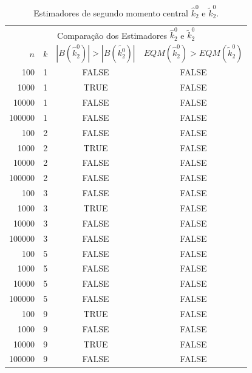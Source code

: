 \documentclass[12pt]{article}
\begin{document}
\begin{table}[h]
  \label{tab:gamma_r_m1}
  \centering
  \begin{tabular}{rccc}
    \toprule
    \multicolumn{4}{c}{Comparação dos Estimadores $\hat{k}_2^0$ e $\tilde{k}_2^0$}\\
    $n$ & $k$ & $|B(\hat{k}_2^0)|>|B(\tilde{k_2^0})|$ & $EQM(\hat{k}_2^0)>EQM(\tilde{k}_2^0)$ \\
    \midrule
    100 & 1 & FALSE & FALSE\\
    1000 & 1 & TRUE & FALSE\\
    10000 & 1 & FALSE & FALSE\\
    100000 & 1 & FALSE & FALSE\\
    100 & 2 & FALSE & FALSE\\
    1000 & 2 & TRUE & FALSE\\
    10000 & 2 & FALSE & FALSE\\
    100000 & 2 & FALSE & FALSE\\
    100 & 3 & FALSE & FALSE\\
    1000 & 3 & TRUE & FALSE\\
    10000 & 3 & FALSE & FALSE\\
    100000 & 3 & FALSE & FALSE\\
    100 & 5 & FALSE & FALSE\\
    1000 & 5 & FALSE & FALSE\\
    10000 & 5 & FALSE & FALSE\\
    100000 & 5 & FALSE & FALSE\\
    100 & 9 & TRUE & FALSE\\
    1000 & 9 & FALSE & FALSE\\
    10000 & 9 & TRUE & FALSE\\
    100000 & 9 & FALSE & FALSE\\
    \bottomrule
  \end{tabular}
  \caption{Estimadores de segundo momento central $\hat{k}_2^0$ e $\tilde{k}_2^0$.}
\end{table}
\end{document}
